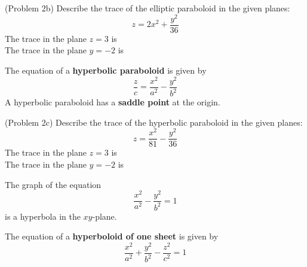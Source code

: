 \documentclass[handout]{ximera}
\begin{document}
\begin{center}
\end{center}






\begin{problem}(Problem 2b)
Describe the trace of the elliptic paraboloid in the given planes:
\[
z = 2x^2 + \frac{y^2}{36}
\]
The trace in the plane $z = 3$ is \\
The trace in the plane $y = -2$ is 
\end{problem}

The equation of a \textbf{hyperbolic paraboloid} is given by 
\[
\frac{z}{c} = \frac{x^2}{a^2} - \frac{y^2}{b^2} 
\]
A hyperbolic paraboloid has a {\bf saddle point} at the origin.


\begin{center}
\end{center}

\begin{image}
\end{image}


\begin{problem}(Problem 2c)
Describe the trace of the hyperbolic paraboloid in the given planes:
\[
z = \frac{x^2}{81} -  \frac{y^2}{36}
\]
The trace in the plane $z = 3$ is \\
The trace in the plane $y = -2$ is 
\begin{hint}
The graph of the equation
\[
\frac{x^2}{a^2} - \frac{y^2}{b^2} = 1
\]
is a hyperbola in the $xy$-plane.
\end{hint}
\end{problem}


The equation of a \textbf{hyperboloid of one sheet} is given by 
\[
\frac{x^2}{a^2} + \frac{y^2}{b^2}- \frac{z^2}{c^2} = 1
\]
\end{document}
